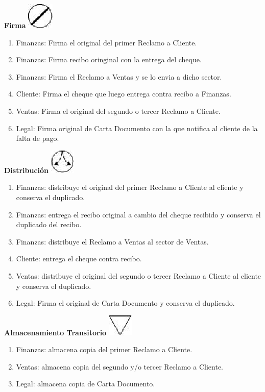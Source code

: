\begin{center}
  \textbf{Firma}
  \includegraphics{../../../Images/Simbolos/simbolo-Firma.png}
\end{center}
\begin{enumerate}
\item Finanzas: Firma el original del primer Reclamo a Cliente.
\item Finanzas: Firma recibo oringinal con la entrega del cheque.
\item Finanzas: Firma el Reclamo a Ventas y se lo envia a dicho sector.
\item Cliente: Firma el cheque que luego entrega contra recibo a Finanzas.
\item Ventas: Firma el original del segundo o tercer Reclamo a Cliente.
\item Legal: Firma original de Carta Documento con la que notifica al cliente de la falta de pago.
\end{enumerate}

\begin{center}
  \textbf{Distribución}
  \includegraphics{../../../Images/Simbolos/simbolo-Distribucion.png}
\end{center}
\begin{enumerate}
\item Finanzas: distribuye el original del primer Reclamo a Cliente al cliente y conserva el duplicado.
\item Finanzas: entrega el recibo original a cambio del cheque recibido y conserva el duplicado del recibo.
\item Finanzas: distribuye el Reclamo a Ventas al sector de Ventas.
\item Cliente: entrega el cheque contra recibo.
\item Ventas: distribuye el original del segundo o tercer Reclamo a Cliente al cliente y conserva el duplicado.
\item Legal: Firma el original de Carta Documento y conserva el duplicado.
\end{enumerate}

\begin{center}
  \textbf{Almacenamiento Transitorio}
  \includegraphics{../../../Images/Simbolos/simbolo-Almacenamiento-Transitorio.png}
\end{center}
\begin{enumerate}
\item Finanzas: almacena copia del primer Reclamo a Cliente.
\item Ventas: almacena copia del segundo y/o tercer Reclamo a Cliente.
\item Legal: almacena copia de Carta Documento.
\end{enumerate}

